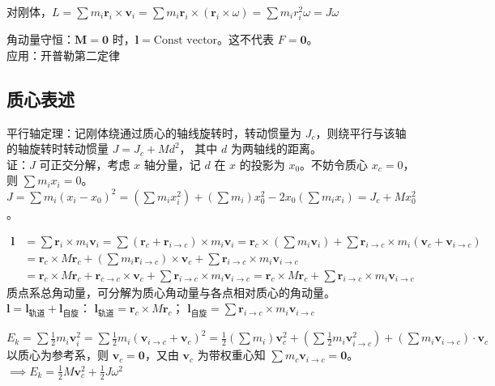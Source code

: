 \documentclass[12pt, a4paper, UTF8, openany]{ctexbook}
\newcommand{\vect}[1]{\mathbf{#1}}
\newcommand{\vecr}{\vect{r}}
\newcommand{\vecv}{\vect{v}}
\newcommand{\vecm}{\vect{M}}
\newcommand{\vecl}{\vect{l}}
\newcommand{\cross}{\times}
\begin{document}
        对刚体，$L = \sum m_i \vecr_i \cross \vecv_i = \sum m_i \vecr_i \cross (\vecr_i \cross \omega) 
        = \sum m_i r_i^2 \omega = J\omega$

        角动量守恒：$\vecm = \vect{0}$ 时，$\vecl = \text{Const vector}$。这不代表 $F = \vect{0}$。\\
        {\heiti 应用}：开普勒第二定律

        \subsection{质心表述}
        平行轴定理：记刚体绕通过质心的轴线旋转时，转动惯量为 $J_c$，则绕平行与该轴的轴旋转时转动惯量 $J = J_c + Md^2$，
        其中 $d$ 为两轴线的距离。\\
        证：$J$ 可正交分解，考虑 $x$ 轴分量，记 $d$ 在 $x$ 的投影为 $x_0$。不妨令质心 $x_c = 0$，则 $\sum m_i x_i = 0$。
        $J = \sum m_i (x_i - x_0)^2 = (\sum m_i x_i^2) + (\sum m_i) x_0^2 - 2x_0(\sum m_i x_i) = J_c + Mx_0^2$。

        $\begin{aligned}
            \vecl &= \sum \vecr_i \cross m_i \vecv_i = \sum (\vecr_c + \vecr_{i \to c}) \cross m_i \vecv_i 
            = \vecr_c \cross (\sum m_i \vecv_i) + \sum \vecr_{i \to c} \cross m_i (\vecv_c + \vecv_{i \to c}) \\
            &= \vecr_c \cross M\vecr_c + (\sum m_i \vecr_{i \to c}) \cross \vecv_c 
            + \sum \vecr_{i \to c} \cross m_i \vecv_{i \to c} \\
            &= \vecr_c \cross M\vecr_c + \vecr_{c \to c} \cross \vecv_c + \sum \vecr_{i \to c} \cross m_i \vecv_{i \to c} 
            = \vecr_c \cross M\vecr_c + \sum \vecr_{i \to c} \cross m_i \vecv_{i \to c}
        \end{aligned}$ \\
        质点系总角动量，可分解为质心角动量与各点相对质心的角动量。\\
        $\vecl = \vecl_{\text{轨道}} + \vecl_{\text{自旋}}$：
        $\vecl_{\text{轨道}} = \vecr_c \cross M \vecr_c$；
        $\vecl_{\text{自旋}} = \sum \vecr_{i \to c} \cross m_i \vecv_{i \to c}$

        $E_{k} = \sum \frac{1}{2} m_i \vecv_i^2 = \sum \frac{1}{2} m_i (\vecv_{i \to c} + \vecv_c)^2 
        = \frac{1}{2} (\sum m_i) \vecv_c^2 + (\sum \frac{1}{2} m_i \vecv_{i \to c}^2) 
        + (\sum m_i \vecv_{i \to c}) \cdot \vecv_c$ \\
        以质心为参考系，则 $\vecv_c = \vect{0}$，又由 $\vecv_c$ 为带权重心知 $\sum m_c \vecv_{i \to c} = \vect{0}$。\\
        $\implies E_{k} = \frac{1}{2} M \vecv_c^2 + \frac{1}{2} J\omega^2$
\end{document}
